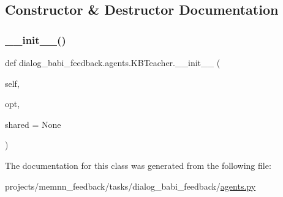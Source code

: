 \subsection{Constructor \& Destructor Documentation}
\mbox{\label{classdialog__babi__feedback_1_1agents_1_1KBTeacher_ad160e36b27da1a5a2d8ff563fb899b09}} 
\subsubsection{\texorpdfstring{\+\_\+\+\_\+init\+\_\+\+\_\+()}{\_\_init\_\_()}}
{\footnotesize\ttfamily def dialog\+\_\+babi\+\_\+feedback.\+agents.\+K\+B\+Teacher.\+\_\+\+\_\+init\+\_\+\+\_\+ (\begin{DoxyParamCaption}\item[{}]{self,  }\item[{}]{opt,  }\item[{}]{shared = {\ttfamily None} }\end{DoxyParamCaption})}



The documentation for this class was generated from the following file\+:\begin{DoxyCompactItemize}
\item 
projects/memnn\+\_\+feedback/tasks/dialog\+\_\+babi\+\_\+feedback/\hyperlink{projects_2memnn__feedback_2tasks_2dialog__babi__feedback_2agents_8py}{agents.\+py}\end{DoxyCompactItemize}
